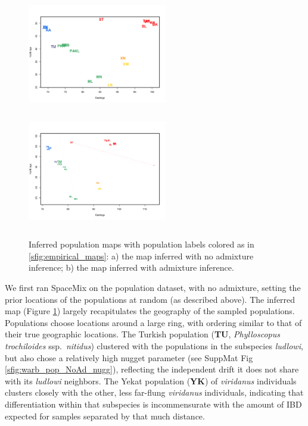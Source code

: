 \documentclass[12pt]{article}
\begin{document}
\begin{figure}
	\centering
			{\includegraphics[width=2.4in,height=2in]{figs/warblers/warb_pop_noad.png}}
			{\includegraphics[width=2.4in,height=2in]{figs/warblers/population_warbler_map_randpr1.png}}
\caption{Inferred population maps with population labels colored as in \ref{sfig:empirical_maps}: a) the map inferred with no admixture inference; b) the map inferred with admixture inference.}
\label{sfig:warbler_pop}
\end{figure}

We first ran SpaceMix on the population dataset, with no admixture, setting the prior locations of the populations at random (as described above). The inferred map (Figure \ref{sfig:warbler_pop}) largely recapitulates the geography of the sampled populations.  Populations choose locations around a large ring, with ordering similar to that of their true geographic locations.  The Turkish population (\textbf{TU}, \textit{Phylloscopus trochiloides} ssp.\ \textit{nitidus}) clustered with the populations in the subspecies \textit{ludlowi}, but also chose a relatively high nugget parameter (see SuppMat Fig \ref{sfig:warb_pop_NoAd_nugg}), reflecting the independent drift it does not share with its \textit{ludlowi} neighbors.  The Yekat population (\textbf{YK}) of \textit{viridanus} individuals clusters closely with the other, less far-flung \textit{viridanus} individuals, indicating that differentiation within that subspecies is incommensurate with the amount of IBD expected for samples separated by that much distance. 
\end{document}
